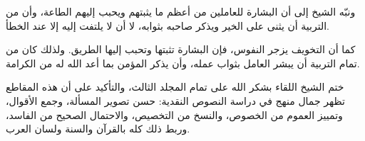 ونبّه الشيخ إلى أن البشارة للعاملين من أعظم ما يثبتهم ويحبب إليهم الطاعة، وأن من التربية أن يثنى على الخير ويذكر صاحبه بثوابه، لا أن لا يلتفت إليه إلا عند الخطأ.

\begin{fawaid}
كما أن التخويف يزجر النفوس، فإن البشارة تثبتها وتحبب إليها الطريق. ولذلك كان من تمام التربية أن يبشر العامل بثواب عمله، وأن يذكر المؤمن بما أعد الله له من الكرامة.
\end{fawaid}

\separator

ختم الشيخ اللقاء بشكر الله على تمام المجلد الثالث، والتأكيد على أن هذه المقاطع تظهر جمال منهج  في دراسة النصوص النقدية: حسن تصوير المسألة، وجمع الأقوال، وتمييز العموم من الخصوص، والنسخ من التخصيص، والاحتمال الصحيح من الفاسد، وربط ذلك كله بالقرآن والسنة ولسان العرب.
